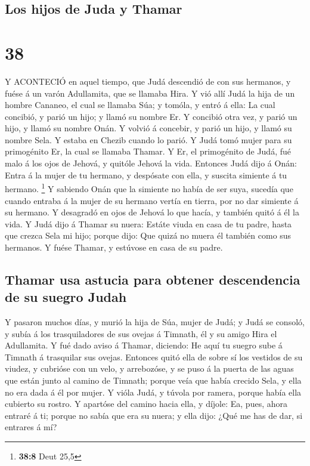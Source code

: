 \hypertarget{los-hijos-de-juda-y-thamar}{%
\subsection{Los hijos de Juda y
Thamar}\label{los-hijos-de-juda-y-thamar}}

\hypertarget{section-37}{%
\section{38}\label{section-37}}

 Y ACONTECIÓ en aquel tiempo, que Judá descendió de con sus
hermanos, y fuése á un varón Adullamita, que se llamaba Hira.
 Y vió allí Judá la hija de un hombre Cananeo, el cual se
llamaba Súa; y tomóla, y entró á ella:  La cual concibió, y
parió un hijo; y llamó su nombre Er.  Y concibió otra vez, y
parió un hijo, y llamó su nombre Onán.  Y volvió á concebir,
y parió un hijo, y llamó su nombre Sela. Y estaba en Chezib cuando lo
parió.  Y Judá tomó mujer para su primogénito Er, la cual se
llamaba Thamar.  Y Er, el primogénito de Judá, fué malo á
los ojos de Jehová, y quitóle Jehová la vida.  Entonces Judá
dijo á Onán: Entra á la mujer de tu hermano, y despósate con ella, y
suscita simiente á tu hermano. \footnote{\textbf{38:8} Deut 25,5}
 Y sabiendo Onán que la simiente no había de ser suya,
sucedía que cuando entraba á la mujer de su hermano vertía en tierra,
por no dar simiente á su hermano.  Y desagradó en ojos de
Jehová lo que hacía, y también quitó á él la vida.  Y Judá
dijo á Thamar su nuera: Estáte viuda en casa de tu padre, hasta que
crezca Sela mi hijo; porque dijo: Que quizá no muera él también como sus
hermanos. Y fuése Thamar, y estúvose en casa de su padre.

\hypertarget{thamar-usa-astucia-para-obtener-descendencia-de-su-suegro-judah}{%
\subsection{Thamar usa astucia para obtener descendencia de su suegro
Judah}\label{thamar-usa-astucia-para-obtener-descendencia-de-su-suegro-judah}}

 Y pasaron muchos días, y murió la hija de Súa, mujer de
Judá; y Judá se consoló, y subía á los trasquiladores de sus ovejas á
Timnath, él y su amigo Hira el Adullamita.  Y fué dado
aviso á Thamar, diciendo: He aquí tu suegro sube á Timnath á trasquilar
sus ovejas.  Entonces quitó ella de sobre sí los vestidos
de su viudez, y cubrióse con un velo, y arrebozóse, y se puso á la
puerta de las aguas que están junto al camino de Timnath; porque veía
que había crecido Sela, y ella no era dada á él por mujer. 
Y vióla Judá, y túvola por ramera, porque había ella cubierto su rostro.
 Y apartóse del camino hacia ella, y díjole: Ea, pues,
ahora entraré á ti; porque no sabía que era su nuera; y ella dijo: ¿Qué
me has de dar, si entrares á mí?

